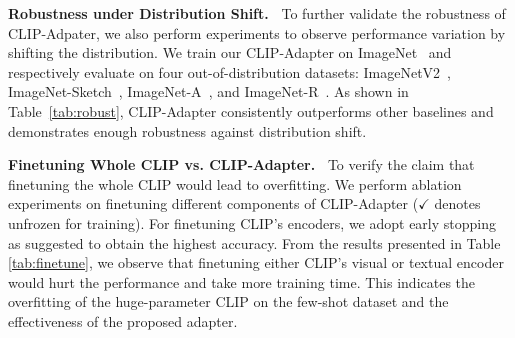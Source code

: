 \documentclass[default,iicol]{sn-jnl}%
\theoremstyle{thmstyleone}%
\theoremstyle{thmstyletwo}%
\theoremstyle{thmstylethree}%
\begin{document}
\vspace{3pt}
\noindent\textbf{Robustness under Distribution Shift.~} To further validate the robustness of CLIP-Adpater, we also perform experiments to observe performance variation by shifting the distribution. We train our CLIP-Adapter on ImageNet~\cite{deng2009imagenet} and respectively evaluate on four out-of-distribution datasets: ImageNetV2~\cite{recht2019imagenet}, ImageNet-Sketch~\cite{hendrycks2021natural}, ImageNet-A~\cite{wang2019learning}, and ImageNet-R~\cite{hendrycks2021many}. As shown in Table~\ref{tab:robust}, CLIP-Adapter consistently outperforms other baselines and demonstrates enough robustness against distribution shift.



\vspace{2pt}
\noindent\textbf{Finetuning Whole CLIP vs. CLIP-Adapter.~} To verify the claim that finetuning the whole CLIP would lead to overfitting. We perform ablation experiments on finetuning different components of CLIP-Adapter ($\checkmark$ denotes unfrozen for training). For finetuning CLIP's encoders, we adopt early stopping as suggested to obtain the highest accuracy. From the results presented in Table \ref{tab:finetune}, we observe that finetuning either CLIP's visual or textual encoder would hurt the performance and take more training time. This indicates the overfitting of the huge-parameter CLIP on the few-shot dataset and the effectiveness of the proposed adapter.
\end{document}
